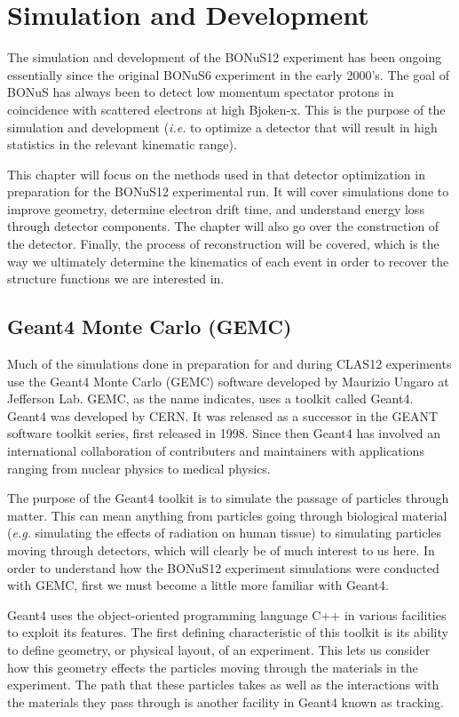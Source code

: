 \chapter{Simulation and Development}
\label{ch:sim}
The simulation and development of the BONuS12 experiment has been ongoing essentially since the original BONuS6 experiment in the early 2000's. The goal of BONuS has always been to detect low momentum spectator protons in coincidence with scattered electrons at high Bjoken-x. This is the purpose of the simulation and development (\textit{i.e.} to optimize a detector that will result in high statistics in the relevant kinematic range).

This chapter will focus on the methods used in that detector optimization in preparation for the BONuS12 experimental run. It will cover simulations done to improve geometry, determine  electron drift time, and understand energy loss through detector components. The chapter will also go over the construction of the detector. Finally, the process of reconstruction will be covered, which is the way we ultimately determine the kinematics of each event in order to recover the structure functions we are interested in.

\section{Geant4 Monte Carlo (GEMC)}
Much of the simulations done in preparation for and during CLAS12 experiments use the Geant4 Monte Carlo (GEMC) software developed by Maurizio Ungaro at Jefferson Lab. GEMC, as the name indicates, uses a toolkit called Geant4. Geant4 was developed by CERN. It was released as a successor in the GEANT software toolkit series, first released in 1998. Since then Geant4 has involved an international collaboration of contributers and maintainers with applications ranging from nuclear physics to medical physics.

The purpose of the Geant4 toolkit is to simulate the passage of particles through matter. This can mean anything from particles going through biological material (\textit{e.g.} simulating the effects of radiation on human tissue) to simulating particles moving through detectors, which will clearly be of much interest to us here. In order to understand how the BONuS12 experiment simulations were conducted with GEMC, first we must become a little more familiar with Geant4.

Geant4 uses the object-oriented programming language C++ in various facilities to exploit its features. The first defining characteristic of this toolkit is its ability to define geometry, or physical layout, of an experiment. This lets us consider how this geometry effects the particles moving through the materials in the experiment. The path that these particles takes as well as the interactions with the materials they pass through is another facility in Geant4 known as tracking.

